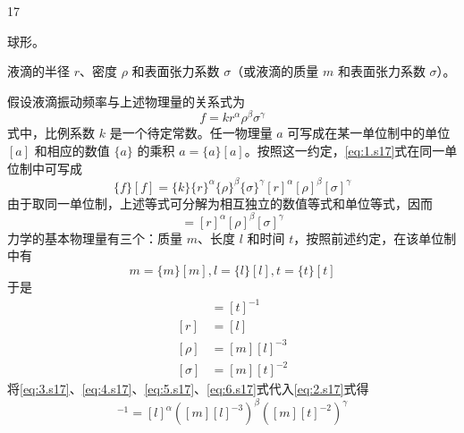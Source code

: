 \begin{solution}{17}
    \begin{subsolution}
        球形。
    \end{subsolution}
    \begin{subsolution}
        液滴的半径 $r$、密度 $\rho$ 和表面张力系数 $\sigma$（或液滴的质量 $m$ 和表面张力系数 $\sigma$）。
    \end{subsolution}
    \begin{subsolution}
        \begin{subsubproblem}
            假设液滴振动频率与上述物理量的关系式为
            \begin{equation}
                f = k r^{\alpha} \rho^{\beta} \sigma^{\gamma}
                \label{eq:1.s17}
            \end{equation}
            式中，比例系数 $k$ 是一个待定常数。任一物理量 $a$ 可写成在某一单位制中的单位 $[a]$ 和相应的数值 $\{a\}$ 的乘积 $a = \{a\}[a]$。按照这一约定，\eqref{eq:1.s17}式在同一单位制中可写成
            \begin{equation*}
                \{f\}[f] = \{k\}\{r\}^{\alpha}\{\rho\}^{\beta}\{\sigma\}^{\gamma}[r]^{\alpha}[\rho]^{\beta}[\sigma]^{\gamma}
            \end{equation*}
            由于取同一单位制，上述等式可分解为相互独立的数值等式和单位等式，因而
            \begin{equation}
                [f] = [r]^{\alpha}[\rho]^{\beta}[\sigma]^{\gamma}
                \label{eq:2.s17}
            \end{equation}
            力学的基本物理量有三个：质量 $m$、长度 $l$ 和时间 $t$，按照前述约定，在该单位制中有
            \begin{equation*}
                m = \{m\}[m], l = \{l\}[l], t = \{t\}[t]
            \end{equation*}
            于是
            \begin{align}
                [f] &= [t]^{-1} \label{eq:3.s17} \\
                [r] &= [l] \label{eq:4.s17} \\
                [\rho] &= [m][l]^{-3} \label{eq:5.s17} \\
                [\sigma] &= [m][t]^{-2} \label{eq:6.s17}
            \end{align}
            将\eqref{eq:3.s17}、\eqref{eq:4.s17}、\eqref{eq:5.s17}、\eqref{eq:6.s17}式代入\eqref{eq:2.s17}式得
            \begin{equation*}
                [t]^{-1} = [l]^{\alpha}([m][l]^{-3})^{\beta}([m][t]^{-2})^{\gamma}

\end{equation*}
\end{subsubproblem}
\end{subsolution}
\end{solution}
